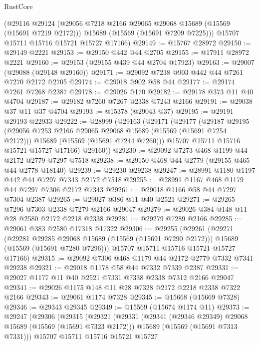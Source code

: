 \begin{lexlean}{RustCore}
\begin{coremodule}
      (@29116
        @29124
        (@29056 @7218 @2166 @29065 @29068 @15689 (@15569 (@15691 @7219 @2172)))
        @15689
        (@15569 (@15691 @7209 @7225)))
      @15707
      @15711
      @15716
      @15721
      @15727
      @17166)
@29149 := @15767 @28972
@29150 := @29149 @2221
@29153 := @29150 @442 @44 @2705
@29155 := @17911 @28972 @2221
@29160 := @29153 (@29155 @439 @44 @2704 @17923)
@29163 := @29007 (@29088 (@29148 @29160))
@29171 := @29092 @7238 @903 @442 @44 @7261 @7270 @2172 @2705
@29174 := @29018 @902 @58 @44
@29177 := @29174 @7261 @7268 @2387
@29178 := @29026 @170
@29182 := @29178 @373 @11 @40 @4704
@29187 := @29182 @7260 @7267 @2338 @7243 @2166
@29191 := @29038 @37 @11 @37 @4704
@29193 := @15378 (@29043 @37)
@29195 := @29191 @29193 @22933
@29222 := @28999
    (@29163
      (@29171
        (@29177
          (@29187
            @29195
            (@29056 @7253 @2166 @29065 @29068 @15689 (@15569 (@15691 @7254 @2172)))
            @15689
            (@15569 (@15691 @7244 @7260)))
          @15707
          @15711
          @15716
          @15721
          @15727
          @17166)
        @29160))
@29230 := @29092 @7273 @468 @1199 @44 @2172 @2779 @7297 @7518
@29238 := @29150 @468 @44 @2779 (@29155 @465 @44 @2778 @18140)
@29239 := @29230 @29238
@29247 := @28991 @1180 @1197 @442 @44 @7297 @7343 @2172 @7518
@29255 := @28991 @1167 @468 @1179 @44 @7297 @7306 @2172 @7343
@29261 := @29018 @1166 @58 @44 @7297 @7304 @2387
@29265 := @29027 @386 @11 @40 @2521
@29271 := @29265 @7296 @7303 @2338 @7279 @2166 @29047
@29279 := @29026 @384 @148 @11 @28 @2580 @2172 @2218 @2338
@29281 := @29279 @7289 @2166
@29285 := @29061 @383 @2580 @17318 @17322
@29306 := @29255
    (@29261
      (@29271
        (@29281 @29285 @29068 @15689 (@15569 (@15691 @7290 @2172)))
        @15689
        (@15569 (@15691 @7280 @7296)))
      @15707
      @15711
      @15716
      @15721
      @15727
      @17166)
@29315 := @29092 @7306 @468 @1179 @44 @2172 @2779 @7332 @7341 @29238
@29321 := @29018 @1178 @58 @44 @7332 @7339 @2387
@29331 := @29027 @1177 @11 @40 @2521 @7331 @7338 @2338 @7312 @2166 @29047
@29341 := @29026 @1175 @148 @11 @28 @7328 @2172 @2218 @2338 @7322 @2166
@29343 := @29061 @1174 @7328
@29345 := @15668 (@15669 @7328)
@29346 := @29343 @29345
@29349 := @15569 (@15674 @1174 @11)
@29373 := @29247
    (@29306
      (@29315
        (@29321
          (@29331
            (@29341 (@29346 @29349) @29068 @15689 (@15569 (@15691 @7323 @2172)))
            @15689
            (@15569 (@15691 @7313 @7331)))
          @15707
          @15711
          @15716
          @15721
          @15727

\end{coremodule}
\end{lexlean}
